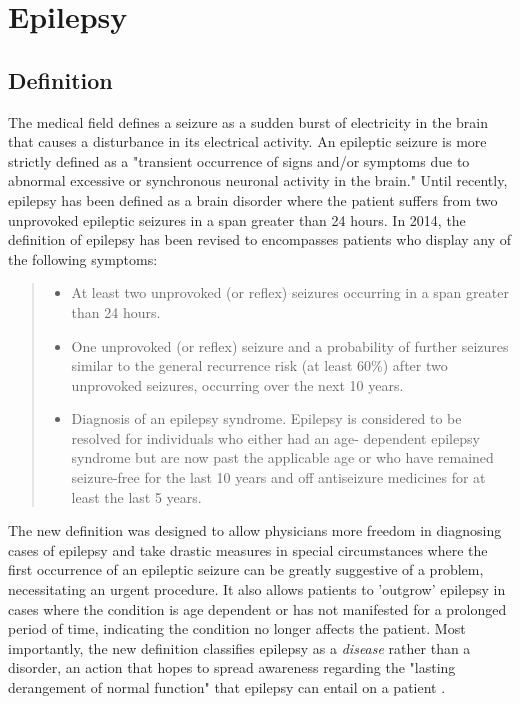 \section{Epilepsy}
\subsection{Definition}
The medical field defines a seizure as a sudden burst of electricity in the brain that causes a disturbance in its electrical activity. An epileptic seizure is more strictly defined as a "transient occurrence of signs and/or symptoms due to abnormal excessive or synchronous neuronal activity in the brain." Until recently, epilepsy has been defined as a brain disorder where the patient suffers from two unprovoked epileptic seizures in a span greater than 24 hours. In 2014, the definition of epilepsy has been revised to encompasses patients who display any of the following symptoms:

\blockquote{
\begin{itemize}
	\item At least two unprovoked (or reflex) seizures occurring in a span greater than 24 hours.
	\item One unprovoked (or reflex) seizure and a probability of further seizures similar to the general recurrence risk  (at least 60\%) after two unprovoked seizures, occurring over the next 10 years.
	\item Diagnosis of an epilepsy syndrome. Epilepsy is considered to be resolved for individuals who either had an age- dependent epilepsy syndrome but are now past the applicable age or who have remained seizure-free for the last 10 years and off antiseizure medicines for at least the last 5 years.
\end{itemize}
}

The new definition was designed to allow physicians more freedom in diagnosing cases of epilepsy and take drastic measures in special circumstances where the first occurrence of an epileptic seizure can be greatly suggestive of a problem, necessitating an urgent procedure. It also allows patients to 'outgrow' epilepsy in cases where the condition is age dependent or has not manifested for a prolonged period of time, indicating the condition no longer affects the patient. Most importantly, the new definition classifies epilepsy as a \textit{disease} rather than a disorder, an action that hopes to spread awareness regarding the "lasting derangement of normal function" that epilepsy can entail on a patient \cite{practicalDefEpi2014}.

